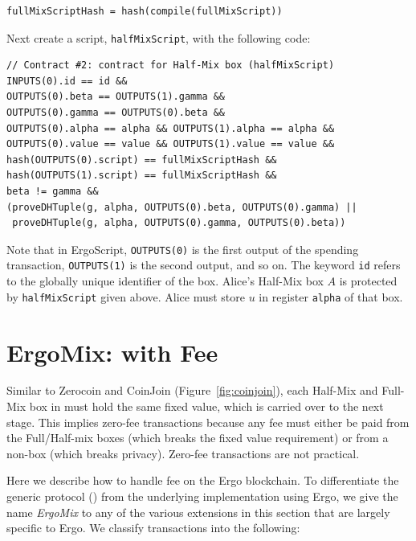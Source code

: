 \documentclass[runningheads]{llncs}
\newcommand{\langname}{ErgoScript\xspace}
\newcommand{\mixname}{ErgoMix\xspace}
\newcommand{\zerocoin}{Zerocoin\xspace}
\begin{document}
{\small
\begin{verbatim}
fullMixScriptHash = hash(compile(fullMixScript))
\end{verbatim}
}
Next create a script, \texttt{halfMixScript}, with the following code:
{\small
\begin{Verbatim}[frame=single]
// Contract #2: contract for Half-Mix box (halfMixScript)
INPUTS(0).id == id &&
OUTPUTS(0).beta == OUTPUTS(1).gamma && 
OUTPUTS(0).gamma == OUTPUTS(0).beta && 
OUTPUTS(0).alpha == alpha && OUTPUTS(1).alpha == alpha &&
OUTPUTS(0).value == value && OUTPUTS(1).value == value &&
hash(OUTPUTS(0).script) == fullMixScriptHash &&  
hash(OUTPUTS(1).script) == fullMixScriptHash &&
beta != gamma &&
(proveDHTuple(g, alpha, OUTPUTS(0).beta, OUTPUTS(0).gamma) || 
 proveDHTuple(g, alpha, OUTPUTS(0).gamma, OUTPUTS(0).beta))
\end{Verbatim}
}

Note that in \langname, \texttt{OUTPUTS(0)} is the first output of the spending transaction, \texttt{OUTPUTS(1)} is the second output, and so on. The keyword \texttt{id} refers to the globally unique identifier of the box. Alice's Half-Mix box $A$ is protected by \texttt{halfMixScript} given above. Alice must store $u$ in register \texttt{alpha} of that box.


\section{\mixname: \algname with Fee}
\label{fee}

Similar to \zerocoin and CoinJoin (Figure~\ref{fig:coinjoin}), each Half-Mix and Full-Mix box in \algname must hold the same fixed value, which is carried over to the next stage. This implies zero-fee transactions because any fee must either be paid from the Full/Half-mix boxes (which breaks the fixed value requirement) or from a non-\algname box (which breaks privacy). Zero-fee transactions are not practical. 

Here we describe how to handle fee on the Ergo blockchain. To differentiate the generic protocol (\algname) from the underlying implementation using Ergo, we give the name {\em \mixname} to any of the various extensions in this section that are largely specific to Ergo. 
We classify \algname transactions into the following:
\end{document}
